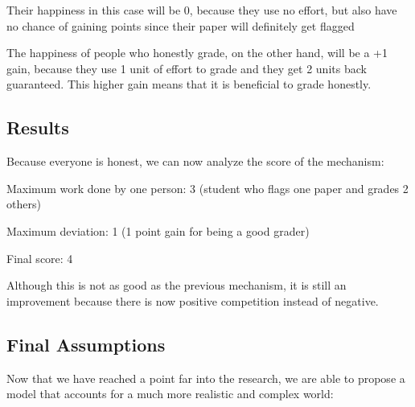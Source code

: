 \documentclass[12pt, Arial]{article}
\begin{document}
Their happiness in this case will be 0, because they use no effort, but also have no chance of gaining points since their paper will definitely get flagged

The happiness of people who honestly grade, on the other hand, will be a +1 gain, because they use 1 unit of effort to grade and they get 2 units back guaranteed. This higher gain means that it is beneficial to grade honestly.

\subsection{Results}
Because everyone is honest, we can now analyze the score of the mechanism:

Maximum work done by one person: 3 (student who flags one paper and grades 2 others)

Maximum deviation: 1 (1 point gain for being a good grader)

Final score: 4

Although this is not as good as the previous mechanism, it is still an improvement because there is now positive competition instead of negative.
\subsection{Final Assumptions}
Now that we have reached a point far into the research, we are able to propose a model that accounts for a much more realistic and complex world:
\end{document}
